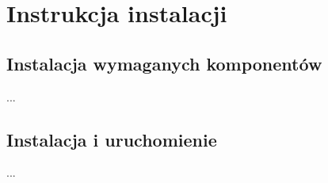 \chapter{Instrukcja instalacji}
\label{Chapterc1}

\section{Instalacja wymaganych komponentów}
...
\section{Instalacja i uruchomienie}
...